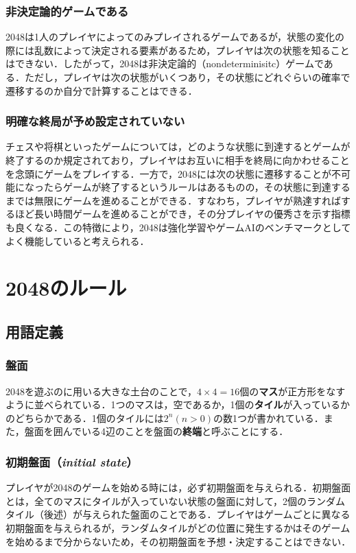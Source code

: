 \documentclass{suribt}
\begin{document}
\subsubsection{非決定論的ゲームである}
2048は1人のプレイヤによってのみプレイされるゲームであるが，状態の変化の際には乱数によって決定される要素があるため，プレイヤは次の状態を知ることはできない．したがって，2048は非決定論的（nondeterminisitc）ゲームである．ただし，プレイヤは次の状態がいくつあり，その状態にどれぐらいの確率で遷移するのか自分で計算することはできる．

\subsubsection{明確な終局が予め設定されていない}
チェスや将棋といったゲームについては，どのような状態に到達するとゲームが終了するのか規定されており，プレイヤはお互いに相手を終局に向かわせることを念頭にゲームをプレイする．一方で，2048には次の状態に遷移することが不可能になったらゲームが終了するというルールはあるものの，その状態に到達するまでは無限にゲームを進めることができる．すなわち，プレイヤが熟達すればするほど長い時間ゲームを進めることができ，その分プレイヤの優秀さを示す指標も良くなる．この特徴により，2048は強化学習やゲームAIのベンチマークとしてよく機能していると考えられる．

\section{2048のルール}
\subsection{用語定義}
\subsubsection{盤面}
2048を遊ぶのに用いる大きな土台のことで，$4 \times 4 = 16$個の\textbf{マス}が正方形をなすように並べられている．1つのマスは，空であるか，1個の\textbf{タイル}が入っているかのどちらかである．1個のタイルには$2^n (n>0)$の数1つが書かれている．また，盤面を囲んでいる4辺のことを盤面の\textbf{終端}と呼ぶことにする．

\subsubsection{初期盤面（\textit{initial state}）}
プレイヤが2048のゲームを始める時には，必ず初期盤面を与えられる．初期盤面とは，全てのマスにタイルが入っていない状態の盤面に対して，2個のランダムタイル（後述）が与えられた盤面のことである．プレイヤはゲームごとに異なる初期盤面を与えられるが，ランダムタイルがどの位置に発生するかはそのゲームを始めるまで分からないため，その初期盤面を予想・決定することはできない．
\end{document}
